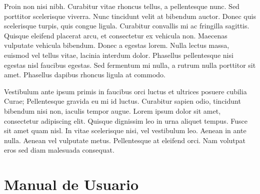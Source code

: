 \documentclass{pfc}
\begin{document}
Proin non nisi nibh. Curabitur vitae rhoncus tellus, a pellentesque
nunc. Sed porttitor scelerisque viverra. Nunc tincidunt velit at
bibendum auctor. Donec quis scelerisque turpis, quis congue
ligula. Curabitur convallis mi ac fringilla sagittis. Quisque eleifend
placerat arcu, et consectetur ex vehicula non. Maecenas vulputate
vehicula bibendum. Donec a egestas lorem. Nulla lectus massa, euismod
vel tellus vitae, lacinia interdum dolor. Phasellus pellentesque nisi
egestas nisl faucibus egestas. Sed fermentum mi nulla, a rutrum nulla
porttitor sit amet. Phasellus dapibus rhoncus ligula at commodo.

Vestibulum ante ipsum primis in faucibus orci luctus et ultrices
posuere cubilia Curae; Pellentesque gravida eu mi id luctus. Curabitur
sapien odio, tincidunt bibendum nisi non, iaculis tempor augue. Lorem
ipsum dolor sit amet, consectetur adipiscing elit. Quisque dignissim
leo in urna aliquet tempus. Fusce sit amet quam nisl. In vitae
scelerisque nisi, vel vestibulum leo. Aenean in ante nulla. Aenean vel
vulputate metus. Pellentesque at eleifend orci. Nam volutpat eros sed
diam malesuada consequat.



\appendix

\chapter{Manual de Usuario}
%



\backmatter
\end{document}
